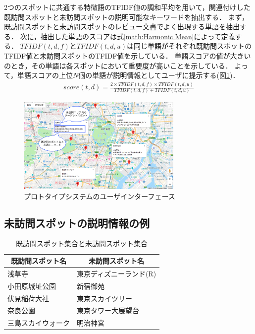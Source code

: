 \documentclass{deimj}
\begin{document}
2つのスポットに共通する特徴語のTFIDF値の調和平均を用いて，関連付けした既訪問スポットと未訪問スポットの説明可能なキーワードを抽出する．
まず，既訪問スポットと未訪問スポットのレビュー文書でよく出現する単語を抽出する．
次に，抽出した単語のスコアは式\ref{math:Harmonic Mean}によって定義する．
$TFIDF(t,d,f)$と$TFIDF(t,d,u)$は同じ単語がそれぞれ既訪問スポットのTFIDF値と未訪問スポットのTFIDF値を示している．
単語スコアの値が大きいのとき，その単語は各スポットにおいて重要度が高いことを示している．
よって，単語スコアの上位$N$個の単語が説明情報としてユーザに提示する(図\ref{fig:Photo_Map})．
\begin{eqnarray}
  score(t,d) = \frac{2 \times TFIDF(t,d,f) \times TFIDF(t,d,u)}{TFIDF(t,d,f) + TFIDF(t,d,u)}
  \label{math:Harmonic Mean}
\end{eqnarray}

\begin{figure}[t]
  \begin{center}
    \includegraphics[clip,width=8.0cm]{picture/Photo_Map2_jap.png}
    \caption{プロトタイプシステムのユーザインターフェース}
    \label{fig:Photo_Map}
   \end{center}
\end{figure}

\subsection{未訪問スポットの説明情報の例}
\label{subsec:未訪問スポットの説明情報の例}

\begin{table}[t]
  \caption{既訪問スポット集合と未訪問スポット集合}
  \label{table:既訪問スポット集合と未訪問スポット集合}
  \centering
  \begin{tabular}{l|l}
  \hline
  \multicolumn{1}{c|}{既訪問スポット名} & \multicolumn{1}{c}{未訪問スポット名} \\ \hline
  浅草寺                           & 東京ディズニーランド(R)                \\
  小田原城址公園                       & 新宿御苑                         \\
  伏見稲荷大社                        & 東京スカイツリー                     \\
  奈良公園                          & 東京タワー大展望台                    \\
  三島スカイウォーク                     & 明治神宮                         \\ \hline
  \end{tabular}
\end{table}
\end{document}
